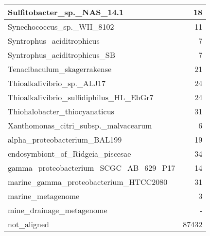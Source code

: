 \documentclass[12pt,a4paper]{article}
\begin{document}
\begin{table}[ht]
\begin{center}
\begin{tabular}{|l*{1}{|r}|}
Sulfitobacter\_sp.\_NAS\_14.1 & 18 \\ \hline
Synechococcus\_sp.\_WH\_8102 & 11 \\ \hline
Syntrophus\_aciditrophicus & 7 \\ \hline
Syntrophus\_aciditrophicus\_SB & 7 \\ \hline
Tenacibaculum\_skagerrakense & 21 \\ \hline
Thioalkalivibrio\_sp.\_ALJ17 & 24 \\ \hline
Thioalkalivibrio\_sulfidiphilus\_HL\_EbGr7 & 24 \\ \hline
Thiohalobacter\_thiocyanaticus & 31 \\ \hline
Xanthomonas\_citri\_subsp.\_malvacearum & 6 \\ \hline
alpha\_proteobacterium\_BAL199 & 19 \\ \hline
endosymbiont\_of\_Ridgeia\_piscesae & 34 \\ \hline
gamma\_proteobacterium\_SCGC\_AB\_629\_P17 & 14 \\ \hline
marine\_gamma\_proteobacterium\_HTCC2080 & 31 \\ \hline
marine\_metagenome & 3 \\ \hline
mine\_drainage\_metagenome & - \\ \hline
not\_aligned & 87432 \\ \hline
\end{tabular}
\end{center}
\end{table}
\end{document}
